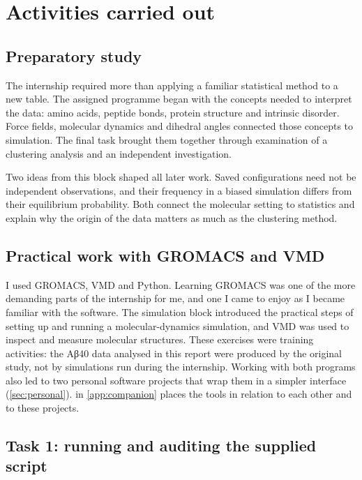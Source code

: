\chapter{Activities carried out}
\label{ch:activities}
\section{Preparatory study}
The internship required more than applying a familiar statistical method to a new table. The assigned programme began with the concepts needed to interpret the data: amino acids, peptide bonds, protein structure and intrinsic disorder. Force fields, molecular dynamics and dihedral angles connected those concepts to simulation. The final task brought them together through examination of a clustering analysis and an independent investigation.

Two ideas from this block shaped all later work. Saved configurations need not be independent observations, and their frequency in a biased simulation differs from their equilibrium probability. Both connect the molecular setting to statistics and explain why the origin of the data matters as much as the clustering method.

\section{Practical work with GROMACS and VMD}
\label{sec:mdpractice}
I used GROMACS, VMD and Python. Learning GROMACS was one of the more demanding parts of the internship for me, and one I came to enjoy as I became familiar with the software. The simulation block introduced the practical steps of setting up and running a molecular-dynamics simulation, and VMD was used to inspect and measure molecular structures. These exercises were training activities: the Aβ40 data analysed in this report were produced by the original study, not by simulations run during the internship. Working with both programs also led to two personal software projects that wrap them in a simpler interface (\cref{sec:personal}).  in \cref{app:companion} places the tools in relation to each other and to these projects.



\section{Task 1: running and auditing the supplied script}
\label{sec:task1}
